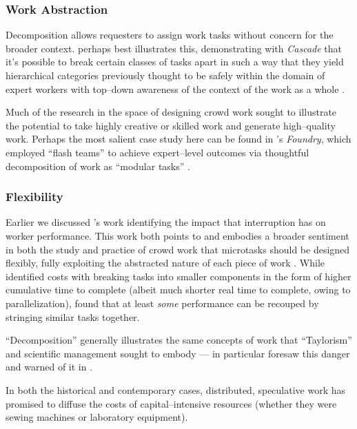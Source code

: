 \documentclass{sigchi}
\begin{document}
\subsubsection{Work Abstraction}\label{sec:workAbstraction}
Decomposition allows requesters to assign work tasks without concern for the broader context.
\citeauthor{chilton2013cascade} perhaps best illustrates this,
demonstrating with \textit{Cascade} that it's possible to
break certain classes of tasks apart
in such a way that they yield hierarchical categories
previously thought to be safely within the domain of expert workers
with top--down awareness of the context of the work as a whole
\cite{chilton2013cascade}.

Much of the research in the space of designing crowd work
sought to illustrate the potential to take highly creative or skilled work
and generate high--quality work.
Perhaps the most salient case study here can be found in
\citeauthor{foundry}'s \textit{Foundry}, which employed
``flash teams'' to achieve expert--level outcomes via thoughtful
decomposition of work as ``modular tasks''
\cite{foundry}.

\subsubsection{Flexibility}\label{sec:flexibility}
Earlier we discussed \citeauthor{cheng2015break}'s work
identifying the impact that interruption has on worker performance.
This work both points to and embodies a broader sentiment in
both the study and practice
of crowd work that microtasks should be designed flexibly,
fully exploiting the abstracted nature of each piece of work
\cite{interruptionIqbal,delayAndOrderLasecki,vaish2014low}.
While \citeauthor{cheng2015break} identified costs with breaking tasks into smaller components
in the form of higher cumulative time to complete
(albeit much shorter real time to complete, owing to parallelization),
\citeauthor{delayAndOrderLasecki} found that at least \textit{some} performance can be recouped by stringing 
similar tasks together.


``Decomposition'' generally illustrates the same concepts of work that ``Taylorism''
and scientific management sought to embody
---
\citeauthor{silberman2010ethics} in particular foresaw this danger and warned of it in
\citeyear{silberman2010ethics}
\cite{crowdworkFuture,silberman2010ethics,nickerson2013crowd}.

In both the historical and contemporary cases,
distributed, speculative work
has promised
to diffuse the costs of capital--intensive resources
(whether they were sewing machines or laboratory equipment).
\end{document}
